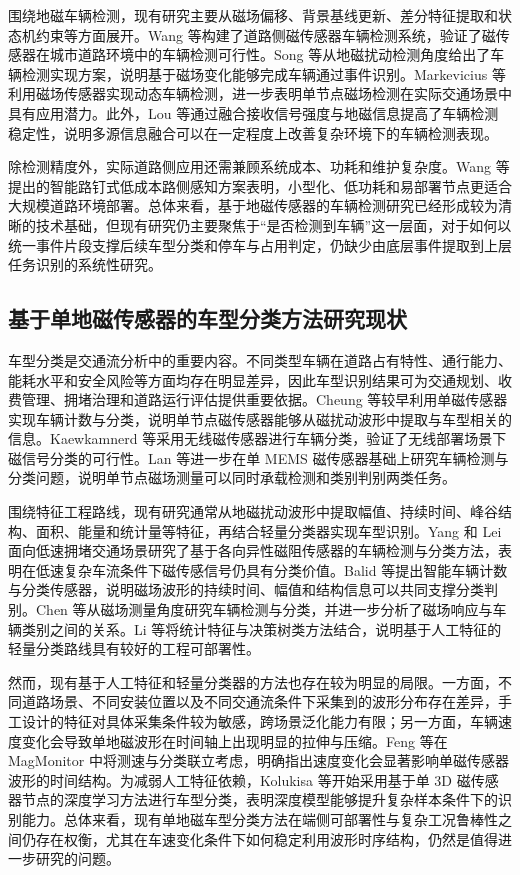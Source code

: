 \documentclass{xdupgthesis}
\begin{document}
围绕地磁车辆检测，现有研究主要从磁场偏移、背景基线更新、差分特征提取和状态机约束等方面展开。Wang 等构建了道路侧磁传感器车辆检测系统，验证了磁传感器在城市道路环境中的车辆检测可行性\cite{R10}。Song 等从地磁扰动检测角度给出了车辆检测实现方案，说明基于磁场变化能够完成车辆通过事件识别\cite{R11}。Markevicius 等利用磁场传感器实现动态车辆检测，进一步表明单节点磁场检测在实际交通场景中具有应用潜力\cite{R12}。此外，Lou 等通过融合接收信号强度与地磁信息提高了车辆检测稳定性，说明多源信息融合可以在一定程度上改善复杂环境下的车辆检测表现\cite{R13}。

除检测精度外，实际道路侧应用还需兼顾系统成本、功耗和维护复杂度。Wang 等提出的智能路钉式低成本路侧感知方案表明，小型化、低功耗和易部署节点更适合大规模道路环境部署\cite{R15}。总体来看，基于地磁传感器的车辆检测研究已经形成较为清晰的技术基础，但现有研究仍主要聚焦于“是否检测到车辆”这一层面，对于如何以统一事件片段支撑后续车型分类和停车与占用判定，仍缺少由底层事件提取到上层任务识别的系统性研究。

\subsection{基于单地磁传感器的车型分类方法研究现状}
\label{sec:related_vehicle_classification}

车型分类是交通流分析中的重要内容。不同类型车辆在道路占有特性、通行能力、能耗水平和安全风险等方面均存在明显差异，因此车型识别结果可为交通规划、收费管理、拥堵治理和道路运行评估提供重要依据。Cheung 等较早利用单磁传感器实现车辆计数与分类，说明单节点磁传感器能够从磁扰动波形中提取与车型相关的信息\cite{R17}。Kaewkamnerd 等采用无线磁传感器进行车辆分类，验证了无线部署场景下磁信号分类的可行性\cite{R21}。Lan 等进一步在单 MEMS 磁传感器基础上研究车辆检测与分类问题，说明单节点磁场测量可以同时承载检测和类别判别两类任务\cite{R22}。

围绕特征工程路线，现有研究通常从地磁扰动波形中提取幅值、持续时间、峰谷结构、面积、能量和统计量等特征，再结合轻量分类器实现车型识别。Yang 和 Lei 面向低速拥堵交通场景研究了基于各向异性磁阻传感器的车辆检测与分类方法，表明在低速复杂车流条件下磁传感信号仍具有分类价值\cite{R20}。Balid 等提出智能车辆计数与分类传感器，说明磁场波形的持续时间、幅值和结构信息可以共同支撑分类判别\cite{R18}。Chen 等从磁场测量角度研究车辆检测与分类，并进一步分析了磁场响应与车辆类别之间的关系\cite{R19}。Li 等将统计特征与决策树类方法结合，说明基于人工特征的轻量分类路线具有较好的工程可部署性\cite{R23}。

然而，现有基于人工特征和轻量分类器的方法也存在较为明显的局限。一方面，不同道路场景、不同安装位置以及不同交通流条件下采集到的波形分布存在差异，手工设计的特征对具体采集条件较为敏感，跨场景泛化能力有限；另一方面，车辆速度变化会导致单地磁波形在时间轴上出现明显的拉伸与压缩。Feng 等在 MagMonitor 中将测速与分类联立考虑，明确指出速度变化会显著影响单磁传感器波形的时间结构\cite{feng2022magmonitor}。为减弱人工特征依赖，Kolukisa 等开始采用基于单 3D 磁传感器节点的深度学习方法进行车型分类，表明深度模型能够提升复杂样本条件下的识别能力\cite{R26}。总体来看，现有单地磁车型分类方法在端侧可部署性与复杂工况鲁棒性之间仍存在权衡，尤其在车速变化条件下如何稳定利用波形时序结构，仍然是值得进一步研究的问题。
\end{document}
